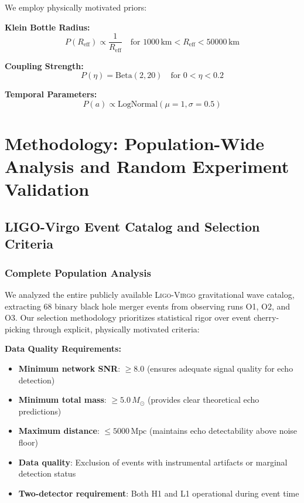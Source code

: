 \documentclass[reprint,amsmath,amssymb,aps,prd]{revtex4-2}
\newcommand{\Reff}{R_{\text{eff}}}
\newcommand{\Msun}{\,M_{\odot}}
\newcommand{\Mpc}{\,\text{Mpc}}
\newcommand{\LIGO}{\textsc{Ligo}\xspace}
\newcommand{\Virgo}{\textsc{Virgo}\xspace}
\begin{document}
We employ physically motivated priors:

\textbf{Klein Bottle Radius:}
\begin{equation}
P(\Reff) \propto \frac{1}{\Reff} \quad \text{for } 1000\,\text{km} < \Reff < 50000\,\text{km}
\label{eq:radius_prior}
\end{equation}

\textbf{Coupling Strength:}
\begin{equation}
P(\eta) = \text{Beta}(2, 20) \quad \text{for } 0 < \eta < 0.2
\label{eq:coupling_prior}
\end{equation}

\textbf{Temporal Parameters:}
\begin{equation}
P(a) \propto \text{LogNormal}(\mu = 1, \sigma = 0.5)
\label{eq:temporal_prior}
\end{equation}


\section{Methodology: Population-Wide Analysis and Random Experiment Validation}
\label{sec:methodology}

\subsection{LIGO-Virgo Event Catalog and Selection Criteria}

\subsubsection{Complete Population Analysis}

We analyzed the entire publicly available \LIGO-\Virgo gravitational wave catalog, extracting 68 binary black hole merger events from observing runs O1, O2, and O3. Our selection methodology prioritizes statistical rigor over event cherry-picking through explicit, physically motivated criteria:

\textbf{Data Quality Requirements:}
\begin{itemize}
\item \textbf{Minimum network SNR}: $\geq 8.0$ (ensures adequate signal quality for echo detection)
\item \textbf{Minimum total mass}: $\geq 5.0\Msun$ (provides clear theoretical echo predictions)
\item \textbf{Maximum distance}: $\leq 5000\Mpc$ (maintains echo detectability above noise floor)
\item \textbf{Data quality}: Exclusion of events with instrumental artifacts or marginal detection status
\item \textbf{Two-detector requirement}: Both H1 and L1 operational during event time
\end{itemize}
\end{document}

